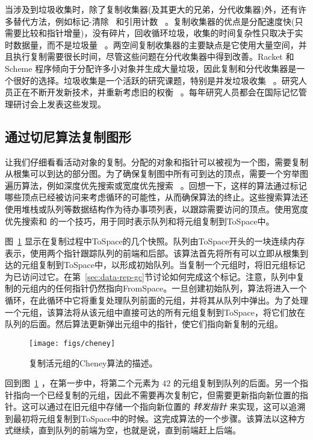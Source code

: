 \documentclass[11pt]{book}
\begin{document}
当涉及到垃圾收集时，除了复制收集器(及其更大的兄弟，分代收集器)外，还有许多替代方法，例如标记-清除~\citep{McCarthy:1960dz} 和引用计数~\citep{Collins:1960aa} 。复制收集器的优点是分配速度快(只需要比较和指针增量)，没有碎片，回收循环垃圾，收集的时间复杂性只取决于实时数据量，而不是垃圾量~\citep{Wilson:1992fk} 。两空间复制收集器的主要缺点是它使用大量空间，并且执行复制需要很长时间，尽管这些问题在分代收集器中得到改善。Racket 和 Scheme 程序倾向于分配许多小对象并生成大量垃圾，因此复制和分代收集器是一个很好的选择。垃圾收集是一个活跃的研究课题，特别是并发垃圾收集~\citep{Tene:2011kx} 。研究人员正在不断开发新技术，并重新考虑旧的权衡~\citep{Blackburn:2004aa,Jones:2011aa,Shahriyar:2013aa,Cutler:2015aa,Shidal:2015aa,Osterlund:2016aa,Jacek:2019aa,Gamari:2020aa} 。每年研究人员都会在国际记忆管理研讨会上发表这些发现。


\subsection{通过切尼算法复制图形}
\label{sec:cheney}
让我们仔细看看活动对象的复制。分配的对象和指针可以被视为一个图，需要复制从根集可以到达的部分图。为了确保复制图中所有可到达的顶点，需要一个穷举图遍历算法，例如深度优先搜索或宽度优先搜索~\citep{Moore:1959aa,Cormen:2001uq} 。回想一下，这样的算法通过标记哪些顶点已经被访问来考虑循环的可能性，从而确保算法的终止。这些搜索算法还使用堆栈或队列等数据结构作为待办事项列表，以跟踪需要访问的顶点。使用宽度优先搜索和 \citet{Cheney:1970aa} 的一个技巧，用于同时表示队列和将元组复制到ToSpace中。

图~\ref{fig:cheney} 显示在复制过程中ToSpace的几个快照。队列由ToSpace开头的一块连续内存表示，使用两个指针跟踪队列的前端和后部。该算法首先将所有可以立即从根集到达的元组复制到ToSpace中，以形成初始队列。当复制一个元组时，将旧元组标记为已访问过它。在第~\ref{sec:data-rep-gc}节讨论如何完成这个标记。注意，队列中复制的元组内的任何指针仍然指向FromSpace。一旦创建初始队列，算法将进入一个循环，在此循环中它将重复处理队列前面的元组，并将其从队列中弹出。为了处理一个元组，该算法将从该元组中直接可达的所有元组复制到ToSpace，将它们放在队列的后面。然后算法更新弹出元组中的指针，使它们指向新复制的元组。

\begin{figure}[tbp]
\centering \texttt{[image: figs/cheney]}
\caption{复制活元组的Cheney算法的描述。}
\label{fig:cheney}
\end{figure}

回到图~\ref{fig:cheney} ，在第一步中，将第二个元素为 $42$ 的元组复制到队列的后面。另一个指针指向一个已经复制的元组，因此不需要再次复制它，但需要更新指向新位置的指针。这可以通过在旧元组中存储一个指向新位置的 \emph{转发指针} 来实现，这可以追溯到最初将元组复制到ToSpace中的时候。这完成算法的一个步骤。该算法以这种方式继续，直到队列的前端为空，也就是说，直到前端赶上后端。
\end{document}
